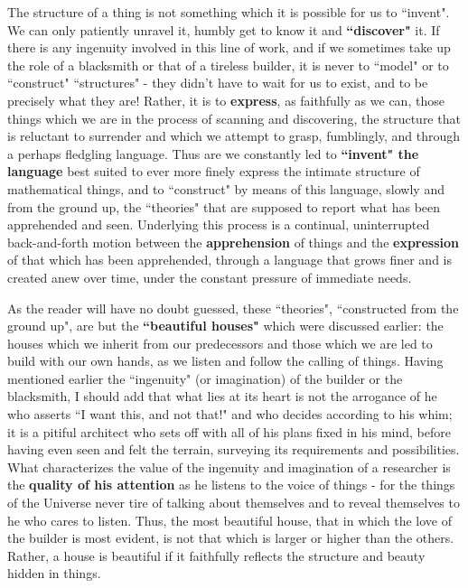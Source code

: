 The structure of a thing is not something which it is possible for us to ``invent". We can only patiently unravel it, humbly get to know it and \textbf{``discover"} it. If there is any ingenuity involved in this line of work, and if we sometimes take up the role of a blacksmith or that of a tireless builder, it is never to ``model" or to ``construct" ``structures" - they didn't have to wait for us to exist, and to be precisely what they are! Rather, it is to \textbf{express}, as faithfully as we can, those things which we are in the process of scanning and discovering, the structure that is reluctant to surrender and which we attempt to grasp, fumblingly, and through a perhaps fledgling language. Thus are we constantly led to \textbf{``invent" the language} best suited to ever more finely express the intimate structure of mathematical things, and to ``construct" by means of this language, slowly and from the ground up, the ``theories" that are supposed to report what has been apprehended and seen. Underlying this process is a continual, uninterrupted back-and-forth motion between the \textbf{apprehension} of things and the \textbf{expression} of that which has been apprehended, through a language that grows finer and is created anew over time, under the constant pressure of immediate needs.

As the reader will have no doubt guessed, these ``theories", ``constructed from the ground up", are but the \textbf{``beautiful houses"} which were discussed earlier: the houses which we inherit from our predecessors and those which we are led to build with our own hands, as we listen and follow the calling of things. Having mentioned earlier the ``ingenuity" (or imagination) of the builder or the blacksmith, I should add that what lies at its heart is not the arrogance of he who asserts ``I want this, and not that!" and who decides according to his whim; it is a pitiful architect who sets off with all of his plans fixed in his mind, before having even seen and felt the terrain, surveying its requirements and possibilities. What characterizes the value of the ingenuity and imagination of a researcher is the \textbf{quality of his attention} as he listens to the voice of things - for the things of the Universe never tire of talking about themselves and to reveal themselves to he who cares to listen. Thus, the most beautiful house,  that in which the love of the builder is most evident, is not that which is larger or higher than the others. Rather, a house is beautiful if it faithfully reflects the structure and beauty hidden in things.

